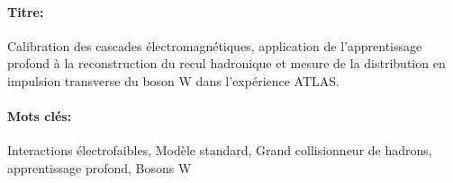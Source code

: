 \begin{mdframed}[linecolor=Prune,linewidth=1]
\vspace{-.25cm}
\paragraph*{Titre:} Calibration des cascades électromagnétiques, application de l’apprentissage profond à la reconstruction du recul hadronique et mesure de la distribution en impulsion transverse du boson W dans l'expérience ATLAS.

\begin{small}
\vspace{-.25cm}
\paragraph*{Mots clés:} Interactions électrofaibles, Modèle standard, Grand collisionneur de hadrons, apprentissage profond, Bosons W

\vspace{-.5cm}
\begin{multicols}{2}

\end{multicols}
\end{small}
\end{mdframed}
